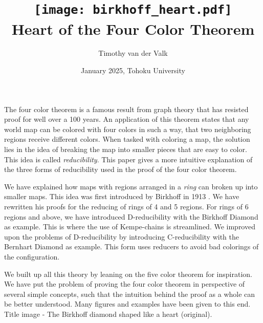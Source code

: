 \documentclass{article}
\title{\vspace{-2cm}\texttt{[image: birkhoff\_heart.pdf]}\\\vspace{0.5cm} Heart of the Four Color Theorem}
\author{Timothy van der Valk}
\date{January 2025, Tohoku University}
\begin{document}
\maketitle

The four color theorem is a famous result from graph theory that has resisted proof for well over a 100 years. An application of this theorem states that any world map can be colored with four colors in such a way, that two neighboring regions receive different colors. When tasked with coloring a map, the solution lies in the idea of breaking the map into smaller pieces that are easy to color. This idea is called \textit{reducibility}. This paper gives a more intuitive explanation of the three forms of reducibility used in the proof of the four color theorem. 

We have explained how maps with regions arranged in a \textit{ring} can broken up into smaller maps. This idea was first introduced by Birkhoff in 1913 \cite{birkhoff}. We have rewritten his proofs for the reducing of rings of 4 and 5 regions. For rings of 6 regions and above, we have introduced D-reducibility with the Birkhoff Diamond as example. This is where the use of Kempe-chains is streamlined. We improved upon the problems of D-reducibility by introducing C-reducibility with the Bernhart Diamond as example. This form uses reducers to avoid bad colorings of the configuration. 

We built up all this theory by leaning on the five color theorem for inspiration. We have put the problem of proving the four color theorem in perspective of several simple concepts, such that the intuition behind the proof as a whole can be better understood. Many figures and examples have been given to this end.
\vspace{0.1cm}\\
{ \tiny Title image - The Birkhoff diamond shaped like a heart (original). }

\pagebreak

\pagebreak


\tableofcontents

\pagebreak






\pagebreak
\printbibliography
\end{document}

